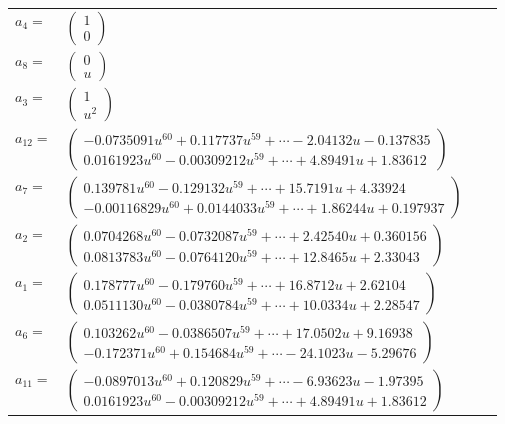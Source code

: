 \documentclass[1p]{elsarticle_modified}
\theoremstyle{definition}
\begin{document}
\begin{tabular}{m{7pt} m{180pt} m{7pt} m{180pt} }
\flushright $a_{4}=$&$\begin{pmatrix}1\\0\end{pmatrix}$ \\
\flushright $a_{8}=$&$\begin{pmatrix}0\\u\end{pmatrix}$ \\
\flushright $a_{3}=$&$\begin{pmatrix}1\\u^2\end{pmatrix}$ \\
\flushright $a_{12}=$&$\begin{pmatrix}-0.0735091 u^{60}+0.117737 u^{59}+\cdots-2.04132 u-0.137835\\0.0161923 u^{60}-0.00309212 u^{59}+\cdots+4.89491 u+1.83612\end{pmatrix}$ \\
\flushright $a_{7}=$&$\begin{pmatrix}0.139781 u^{60}-0.129132 u^{59}+\cdots+15.7191 u+4.33924\\-0.00116829 u^{60}+0.0144033 u^{59}+\cdots+1.86244 u+0.197937\end{pmatrix}$ \\
\flushright $a_{2}=$&$\begin{pmatrix}0.0704268 u^{60}-0.0732087 u^{59}+\cdots+2.42540 u+0.360156\\0.0813783 u^{60}-0.0764120 u^{59}+\cdots+12.8465 u+2.33043\end{pmatrix}$ \\
\flushright $a_{1}=$&$\begin{pmatrix}0.178777 u^{60}-0.179760 u^{59}+\cdots+16.8712 u+2.62104\\0.0511130 u^{60}-0.0380784 u^{59}+\cdots+10.0334 u+2.28547\end{pmatrix}$ \\
\flushright $a_{6}=$&$\begin{pmatrix}0.103262 u^{60}-0.0386507 u^{59}+\cdots+17.0502 u+9.16938\\-0.172371 u^{60}+0.154684 u^{59}+\cdots-24.1023 u-5.29676\end{pmatrix}$ \\
\flushright $a_{11}=$&$\begin{pmatrix}-0.0897013 u^{60}+0.120829 u^{59}+\cdots-6.93623 u-1.97395\\0.0161923 u^{60}-0.00309212 u^{59}+\cdots+4.89491 u+1.83612\end{pmatrix}$ \\

\end{tabular}
\end{document}
